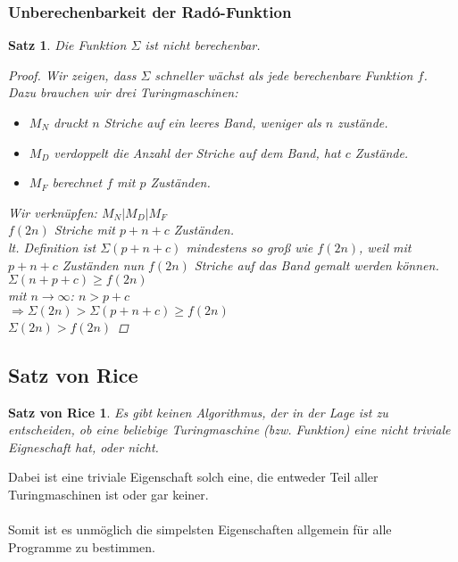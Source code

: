 \documentclass{article}
\begin{document}
\subsubsection{Unberechenbarkeit der Rad\'o-Funktion}
\begin{framed}
    \newtheorem{rado}{Satz}
    \begin{rado}
        Die Funktion $\Sigma$ ist nicht berechenbar.

        \begin{proof}
            Wir zeigen, dass $\Sigma$ schneller wächst als jede berechenbare Funktion $f$.\\
            Dazu brauchen wir drei Turingmaschinen:
            \begin{itemize}
                \item $M_N$ druckt $n$ Striche auf ein leeres Band, weniger als $n$ zustände.
                \item $M_D$ verdoppelt die Anzahl der Striche auf dem Band, hat $c$ Zustände.
                \item $M_F$ berechnet $f$ mit $p$ Zuständen.
            \end{itemize}
            Wir verknüpfen: $M_N | M_D | M_F$ \\
            \Rightarrow $f(2n)$ Striche mit $p+n+c$ Zuständen.\\
            lt. Definition ist $\Sigma(p+n+c)$ mindestens so groß wie $f(2n)$, weil mit $p+n+c$ Zuständen nun $f(2n)$ Striche auf das Band gemalt werden können.\\
            \Rightarrow $\Sigma(n+p+c) \geq f(2n)$\\
            mit $n\rightarrow\infty$: $n>p+c$\\$\Rightarrow\Sigma(2n) > \Sigma(p+n+c)\geq f(2n)$\\
                \Rightarrow $\Sigma(2n)>f(2n)$\qedhere
        \end{proof}
    \end{rado}
\end{framed}
\subsection{Satz von Rice}
\newtheorem{rice}{Satz von Rice}
\begin{framed}
    \begin{rice}
        Es gibt keinen Algorithmus, der in der Lage ist zu entscheiden, ob eine beliebige Turingmaschine (bzw. Funktion) eine nicht triviale Eigneschaft hat, oder nicht. 
    \end{rice} 
\end{framed}
Dabei ist eine triviale Eigenschaft solch eine, die entweder Teil aller Turingmaschinen ist oder gar keiner.\\
\\
Somit ist es unmöglich die simpelsten Eigenschaften allgemein für alle Programme zu bestimmen.
\end{document}
